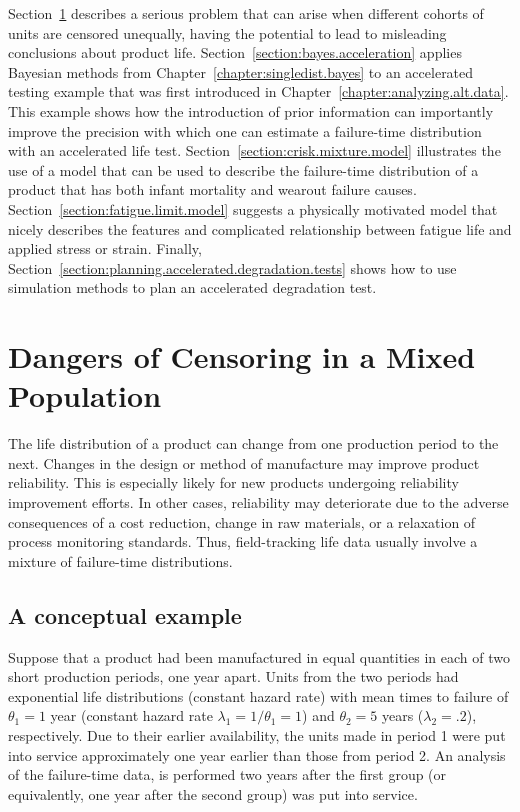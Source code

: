 Section~\ref{section:cen.mixed.pop} describes a serious problem that
can arise when different cohorts of units are censored unequally,
having the potential to lead to misleading conclusions about product
life.  Section~\ref{section:bayes.acceleration} applies Bayesian
methods from Chapter~\ref{chapter:singledist.bayes} to an
accelerated testing example that was first introduced in
Chapter~\ref{chapter:analyzing.alt.data}.  This example shows
how the introduction of prior information can importantly improve
the precision with which one can estimate a failure-time
distribution with an accelerated life test.
Section~\ref{section:crisk.mixture.model} illustrates the use of a
model that can be used to describe the failure-time distribution of
a product that has both infant mortality and wearout failure causes.
Section~\ref{section:fatigue.limit.model} suggests a physically
motivated model that nicely describes the features and complicated
relationship between fatigue life and applied stress or strain.
Finally,
Section~\ref{section:planning.accelerated.degradation.tests} shows
how to use simulation methods to plan an accelerated degradation test.

\section{Dangers of Censoring in a Mixed Population}
\label{section:cen.mixed.pop}

The life distribution of a product can change from one production
period to the next.  Changes in the design or method of manufacture
may improve product reliability.  This is especially likely for new products
undergoing reliability improvement efforts.  In other cases,
reliability may deteriorate due to the adverse consequences of a cost
reduction, change in raw materials, or a relaxation of process
monitoring standards.  Thus, field-tracking life data usually involve
a mixture of failure-time distributions.

\subsection{A conceptual example}
Suppose that a product had been manufactured in equal quantities in each of
two short production periods, one year apart.  Units from the two
periods had exponential life distributions (constant hazard rate) with
mean times to failure of $\theta_{1}=1$ year (constant hazard rate
$\lambda_{1}=1/\theta_{1}=1$) and $\theta_{2}=5$ years
($\lambda_{2}=.2$), respectively.  Due to their earlier availability,
the units made in period 1 were put into service approximately one
year earlier than those from period 2. An analysis of the
failure-time data, is performed two years after the first group (or
equivalently, one year after the second group) was put into service.

